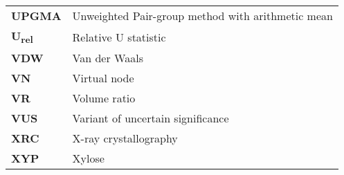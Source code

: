 \begin{longtable}[l]{@{}p{2.5cm}p{12cm}@{}}
\textbf{UPGMA} & Unweighted Pair-group method with arithmetic mean \\
\textbf{U\textsubscript{rel}} & Relative U statistic \\
\textbf{VDW} & Van der Waals \\
\textbf{VN} & Virtual node \\
\textbf{VR} & Volume ratio \\
\textbf{VUS} & Variant of uncertain significance \\
\textbf{XRC} & X-ray crystallography \\
\textbf{XYP} & Xylose \\

\end{longtable}
